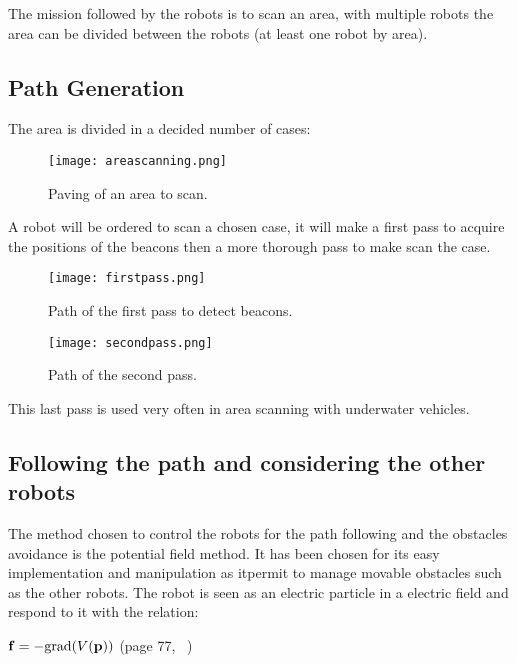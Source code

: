 The mission followed by the robots is to scan an area, with multiple robots the area can be divided between the robots (at least one robot by area).

\subsection{Path Generation}

The area is divided in a decided number of cases:

\begin{figure}[H]
\centering
\texttt{[image: areascanning.png]}
\caption{Paving of an area to scan.}
\label{fig:areaScan}
\end{figure}

A robot will be ordered to scan a chosen case, it will make a first pass to acquire the positions of the beacons then a more thorough pass to make scan the case.

\begin{figure}[H]
\centering
    \begin{minipage}[b]{0.4\textwidth}
    \texttt{[image: firstpass.png]}
    \caption{Path of the first pass to detect beacons.}
    \label{fig:firstpass}
    \end{minipage}
    \begin{minipage}[b]{0.4\textwidth}
    \texttt{[image: secondpass.png]}
    \caption{Path of the second pass.}
    \label{fig:secondpass}
    \end{minipage}
\end{figure}

This last pass is used very often in area scanning with underwater vehicles.


\subsection{Following the path and considering the other robots}

The method chosen to control the robots for the path following and the obstacles avoidance is the potential field method. It has been chosen for its easy implementation and manipulation as itpermit to manage movable obstacles such as the other robots.
The robot is seen as an electric particle in a electric field and respond to it with the relation:

$\mathbf{f} = -\textnormal{grad}(V(\mathbf{p}))$ (page 77, ~\cite{jaulin2015mobile})\\


